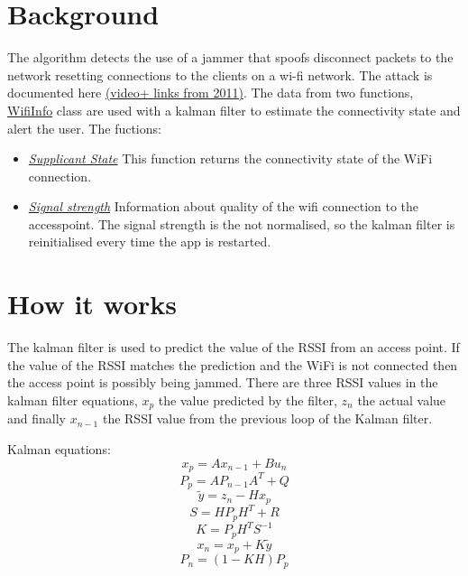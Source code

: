 \documentclass[a4paper,10pt]{article}
\title{}
\author{}
\begin{document}
\section{Background}
The algorithm detects the use of a jammer that spoofs disconnect packets to the network resetting connections to the clients on a wi-fi network. The attack is documented here \href{http://hackaday.com/2011/10/04/wifi-jamming-via-deauthentication-packets/}{(video+ links from 2011)}. The data from two functions, \href{http://developer.android.com/reference/android/net/wifi/WifiInfo.html}{WifiInfo} class are used with a kalman filter to estimate the connectivity state and  alert the user.
The fuctions:
\begin{itemize}
 \item \emph{\href{http://developer.android.com/reference/android/net/wifi/WifiInfo.html\#getSupplicantState()}{Supplicant State}} This function returns the connectivity state of the WiFi connection.
 \item \emph{\href{http://developer.android.com/reference/android/net/wifi/WifiInfo.html\#getRssi()}{Signal strength}} Information about quality of the wifi connection to the accesspoint. The signal strength is the not normalised, so the kalman filter is reinitialised every time the app is restarted.
\end{itemize}

\section{How it works}
The kalman filter is used to predict the value of the RSSI from an access point. If the value of the RSSI matches the prediction and the WiFi is not connected then the access point is possibly being jammed. There are three RSSI values in the kalman filter equations, $x_p$ the value predicted by the filter, $z_n$ the actual value and finally $x_{n-1}$ the RSSI value from the previous loop of the Kalman filter.

Kalman equations:
\[x_p = Ax_{n-1} + Bu_n \]
\[P_p = AP_{n-1}A^T + Q \]
\[\widetilde{y} = z_n - Hx_p \]
\[S = HP_pH^T +R\]
\[K = P_p H^TS^{-1} \]
\[x_n = x_p+K\widetilde{y} \]
\[P_n = (1-KH)P_p \]
\end{document}
